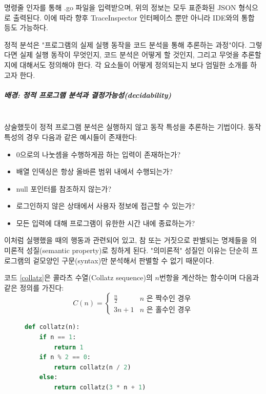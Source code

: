 \documentclass[a4paper,12pt]{article}
\begin{document}
명령줄 인자를 통해 .go 파일을 입력받으며, 위의 정보는 모두 표준화된 JSON 형식으로 출력된다. 이에 따라 향후 \textsf{TraceInspector} 인터페이스 뿐만 아니라 
IDE와의 통합 등도 가능하다.

정적 분석은 "프로그램의 실제 실행 동작을 코드 분석을 통해 추론하는 과정"이다. 그렇다면 실제 실행 동작이 무엇인지, 코드 분석은 어떻게 할 것인지, 그리고 무엇을
추론할지에 대해서도 정의해야 한다. 각 요소들이 어떻게 정의되는지 보다 엄밀한 소개를 하고자 한다.

\subparagraph{배경: 정적 프로그램 분석과 결정가능성(decidability)} ~\\

상술했듯이 정적 프로그램 분석은 실행하지 않고 동작 특성을 추론하는 기법이다. 동작 특성의 경우 다음과 같은 예시들이 존재한다:

\begin{itemize}
    \item 0으로의 나눗셈을 수행하게끔 하는 입력이 존재하는가?
    \item 배열 인덱싱은 항상 올바른 범위 내에서 수행되는가?
    \item null 포인터를 참조하지 않는가?
    \item 로그인하지 않은 상태에서 사용자 정보에 접근할 수 있는가?
    \item 모든 입력에 대해 프로그램이 유한한 시간 내에 종료하는가?
\end{itemize}

이처럼 실행했을 때의 행동과 관련되어 있고, 참 또는 거짓으로 판별되는 명제들을 의미론적 성질(semantic property)로 칭하게 된다. "의미론적" 성질인 이유는 
단순히 프로그램의 겉모양인 구문(syntax)만 분석해서 판별할 수 없기 때문이다. 

코드 \ref{collatz}은 콜라츠 수열(Collatz sequence)의 $n$번항을 계산하는 함수이며 다음과 같은 정의를 가진다:
$$
C(n) =
\begin{cases}
    \frac{n}{2} & n \text{ 은 짝수인 경우} \\
    3n + 1 & n \text{ 은 홀수인 경우}
\end{cases}
$$

\begin{figure}[h]
  \centering %
  \begin{minipage}{0.6\textwidth} %
    \begin{lstlisting}[language=python, caption={Collatz 수열을 계산하는 코드}, label={collatz}, captionpos=b]
def collatz(n):
    if n == 1:
        return 1
    if n % 2 == 0:
        return collatz(n / 2)
    else:
        return collatz(3 * n + 1)
    \end{lstlisting}
  \end{minipage}
\end{figure}
\end{document}
